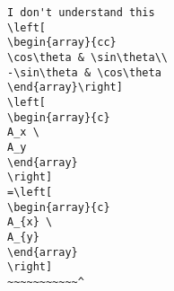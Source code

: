 \begin{verbatim}
I don't understand this
\left[
\begin{array}{cc}
\cos\theta & \sin\theta\\
-\sin\theta & \cos\theta
\end{array}\right]
\left[
\begin{array}{c}
A_x \ 
A_y 
\end{array}
\right]
=\left[
\begin{array}{c}
A_{x} \ 
A_{y} 
\end{array}
\right]
~~~~~~~~~~~^
\end{verbatim}

